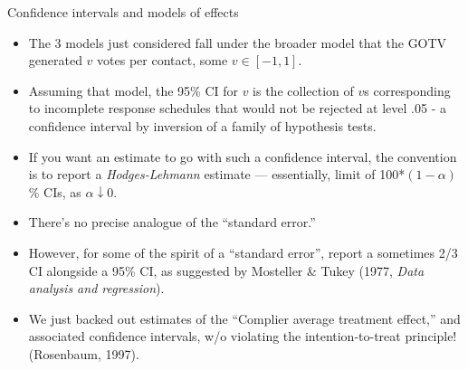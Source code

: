 \begin{frame}{Confidence intervals and models of effects}

  \begin{itemize}[<+->]
  \item The 3 models just considered fall under the broader model that the GOTV  
generated $v$ votes per contact, some $v \in [-1, 1]$.
\item Assuming that model, the 95\% CI for $v$ is the collection of $v$s corresponding to incomplete response schedules that would not be rejected at level .05 - a confidence interval by inversion of a family of hypothesis tests.
\item If you want an estimate to go with such a confidence interval, the convention is to report a \textit{Hodges-Lehmann} estimate --- essentially, limit of 100*$(1-\alpha)$\% CIs, as $\alpha \downarrow 0$.
\item There's no precise analogue of the ``standard error.''
\item However, for some of the spirit of a ``standard error'', report a sometimes 2/3 CI alongside a 95\% CI, as suggested by Mosteller \& Tukey (1977, \textit{Data analysis and regression}).
\item We just backed out estimates of the ``Complier average treatment effect,'' and associated confidence intervals, w/o violating the intention-to-treat principle! (Rosenbaum, 1997).
  \end{itemize}


\end{frame}


